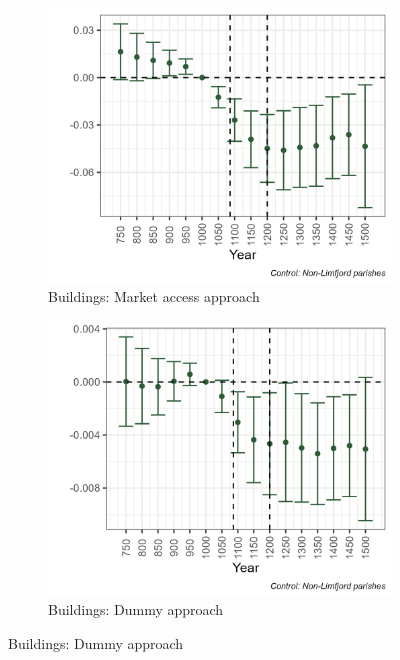\begin{figure}[h!]
\begin{subfigure}[b]{0.45\textwidth}
    \end{subfigure}
    \vspace{0.45cm}
    \begin{subfigure}[b]{0.45\textwidth}
        \centering
        \caption{\label{fig:arch1c} Buildings: Market access approach}
        \includegraphics[width=\textwidth]{Plots/Regression_plots/arch_MA_buildings_norm.png}
    \end{subfigure}
    \hfill
    \begin{subfigure}[b]{0.45\textwidth}
        \centering
        \caption{\label{fig:arch1d} Buildings: Dummy approach}
        \includegraphics[width=\textwidth]{Plots/Regression_plots/arch_dummy_buildings_norm.png}
    \end{subfigure}
    \label{fig:arch_reg1}
\end{figure}


